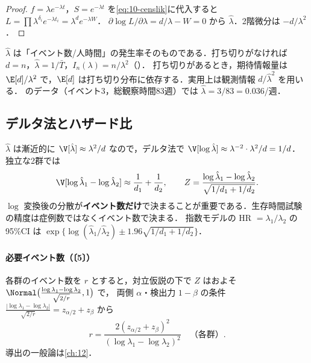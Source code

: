 \begin{proof}
$f=\lambda e^{-\lambda t}$，$S=e^{-\lambda t}$ を\cref{eq:10-censlik}に代入すると $L=\prod\lambda^{\delta_i}e^{-\lambda t_i}=\lambda^de^{-\lambda W}$．
$\partial\log L/\partial\lambda=d/\lambda-W=0$ から $\hat\lambda$．2階微分は $-d/\lambda^2$．
\end{proof}
$\hat\lambda$ は「イベント数/人時間」の発生率そのものである．打ち切りがなければ $d=n$，$\hat\lambda=1/\bar T$，$I_n(\lambda)=n/\lambda^2$（）．
\Youchui 打ち切りがあるとき，期待情報量は $\E[d]/\lambda^2$ で，$\E[d]$ は打ち切り分布に依存する．実用上は観測情報 $d/\hat\lambda^2$ を用いる．
 のデータ（イベント3，総観察時間83週）では $\hat\lambda=3/83=0.036$/週．

\subsection{デルタ法とハザード比}\label{subsec:10-expdelta}
$\hat\lambda$ は漸近的に $\V[\hat\lambda]\approx\lambda^2/d$ なので，デルタ法で $\V[\log\hat\lambda]\approx\lambda^{-2}\cdot\lambda^2/d=1/d$．
独立な2群では
\begin{equation}
\V[\log\hat\lambda_1-\log\hat\lambda_2]\approx\frac{1}{d_1}+\frac{1}{d_2},\qquad
Z=\frac{\log\hat\lambda_1-\log\hat\lambda_2}{\sqrt{1/d_1+1/d_2}}.\label{eq:10-expz}
\end{equation}
$\log$ 変換後の分散が\textbf{イベント数だけ}で決まることが重要である．生存時間試験の精度は症例数ではなくイベント数で決まる．
指数モデルの HR $=\lambda_1/\lambda_2$ の95\%CI は $\exp\{\log(\hat\lambda_1/\hat\lambda_2)\pm1.96\sqrt{1/d_1+1/d_2}\}$．

\paragraph{必要イベント数（〔5〕）}
各群のイベント数を $r$ とすると，対立仮説の下で $Z$ はおよそ $\Normal\bigl(\frac{\log\lambda_1-\log\lambda_2}{\sqrt{2/r}},1\bigr)$ で，
両側 $\alpha$・検出力 $1-\beta$ の条件 $\frac{|\log\lambda_1-\log\lambda_2|}{\sqrt{2/r}}=z_{\alpha/2}+z_\beta$ から
\begin{equation}
r=\frac{2(z_{\alpha/2}+z_\beta)^2}{(\log\lambda_1-\log\lambda_2)^2}\quad\text{（各群）}.\label{eq:10-events}
\end{equation}
導出の一般論は\cref{ch:12}．


